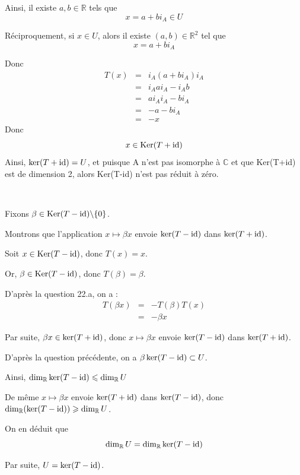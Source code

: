 Ainsi, il existe $a, b \in \mathbb{R}$ tels que
\[ x = a + b i_A \in U \]


R{\'e}ciproquement, si $x \in U$, alors il existe $(a, b) \in \mathbb{R}^2$
tel que
\[ x = a + b i_A \]


Donc
\begin{eqnarray*}
  T (x) & = & i_A (a + b  i_A) i_A\\
  & = & i_A a i_A - i_A b\\
  & = & a i_A i_A - b i_A\\
  & = & - a - b i_A\\
  & = & - x
\end{eqnarray*}
Donc
\[ x \in \operatorname{Ker} (T + \operatorname{id}) \]
Ainsi, $\ker (T + \operatorname{id}) = U$, et puisque A n'est pas isomorphe {\`a}
$\mathbb{C}$ et que Ker(T+id) est de dimension 2, alors Ker(T-id) n'est pas
r{\'e}duit {\`a} z{\'e}ro.

\

 Fixons $\beta \in \operatorname{Ker} (T - \operatorname{id}) \backslash
 \{ 0 \}$.

 Montrons que l'application $x \longmapsto \beta x$ envoie
$\ker (T - \operatorname{id})$ dans $\ker (T + \operatorname{id})$.

Soit $x \in \operatorname{Ker} (T - \operatorname{id})$, donc $T (x) = x$.

Or, $\beta \in \operatorname{Ker} (T - \operatorname{id})$, donc $T (\beta) = \beta$.

D'apr{\`e}s la question 22.a, on a :
\begin{eqnarray*}
  T (\beta x) & = & - T (\beta) T (x)\\
  & = & - \beta x
\end{eqnarray*}


Par suite, $\beta x \in \ker (T + \operatorname{id})$, donc $x \longmapsto \beta x$
envoie $\ker (T - \operatorname{id})$ dans $\ker (T + \operatorname{id})$.

D'apr{\`e}s la question pr{\'e}c{\'e}dente, on a $\beta \ker (T - \operatorname{id})
\subset U$.

Ainsi, $\dim_{\mathbb{R}} \ker (T - \operatorname{id}) \leqslant \dim_{\mathbb{R}} U$

De m{\^e}me $x \longmapsto \beta x$ envoie $\ker (T + \operatorname{id})$ dans $\ker
(T - \operatorname{id})$, donc $\dim_{\mathbb{R}} (\ker (T - \operatorname{id})) \geqslant
\dim_{\mathbb{R}} U$.

On en d{\'e}duit que
\[ \dim_{\mathbb{R}} U = \dim_{\mathbb{R}} \ker (T - \operatorname{id}) \]


Par suite, $U = \ker (T - \operatorname{id})$.

